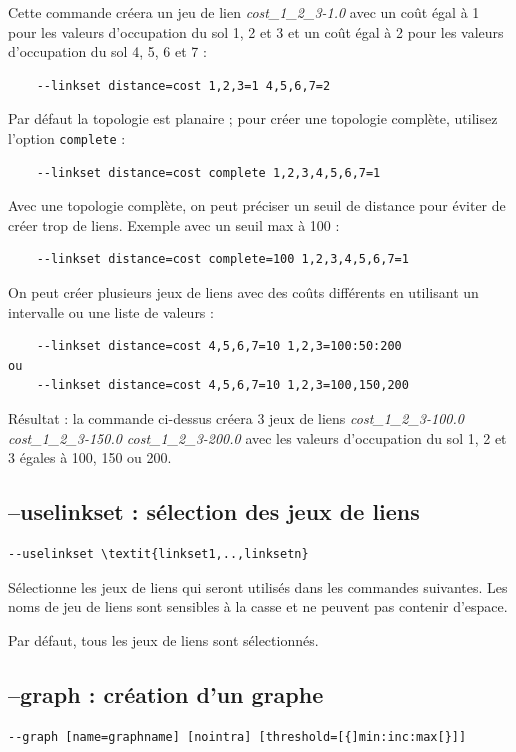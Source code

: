 \documentclass[a4paper,10pt]{report}
\begin{document}
Cette commande créera un jeu de lien \textit{cost\_1\_2\_3-1.0} avec un coût égal à 1 pour les valeurs d'occupation du sol 1, 2 et 3 et un coût égal à 2 pour les valeurs d'occupation du sol 4, 5, 6 et 7 :
\begin{Verbatim}
	--linkset distance=cost 1,2,3=1 4,5,6,7=2
\end{Verbatim}

Par défaut la topologie est planaire ; pour créer une topologie complète, utilisez l'option \verb|complete| :
\begin{Verbatim}
	--linkset distance=cost complete 1,2,3,4,5,6,7=1
\end{Verbatim}

Avec une topologie complète, on peut préciser un seuil de distance pour éviter de créer trop de liens. Exemple avec un seuil max à 100 :
\begin{Verbatim}
	--linkset distance=cost complete=100 1,2,3,4,5,6,7=1
\end{Verbatim}

On peut créer plusieurs jeux de liens avec des coûts différents en utilisant un intervalle ou une liste de valeurs :
\begin{Verbatim}
	--linkset distance=cost 4,5,6,7=10 1,2,3=100:50:200
ou
	--linkset distance=cost 4,5,6,7=10 1,2,3=100,150,200
\end{Verbatim}
Résultat : la commande ci-dessus créera 3 jeux de liens \textit{cost\_1\_2\_3-100.0 cost\_1\_2\_3-150.0 cost\_1\_2\_3-200.0}
avec les valeurs d'occupation du sol 1, 2 et 3 égales à 100, 150 ou 200.

\subsection{--uselinkset : sélection des jeux de liens}
\label{uselinkset}
\begin{Verbatim}[commandchars=\\\{\}]
--uselinkset \textit{linkset1,..,linksetn}
\end{Verbatim}
Sélectionne les jeux de liens qui seront utilisés dans les commandes suivantes.
Les noms de jeu de liens sont sensibles à la casse et ne peuvent pas contenir d'espace.

Par défaut, tous les jeux de liens sont sélectionnés.

\subsection{--graph : création d'un graphe}
\begin{Verbatim}
--graph [name=graphname] [nointra] [threshold=[{]min:inc:max[}]]
\end{Verbatim}
\end{document}
